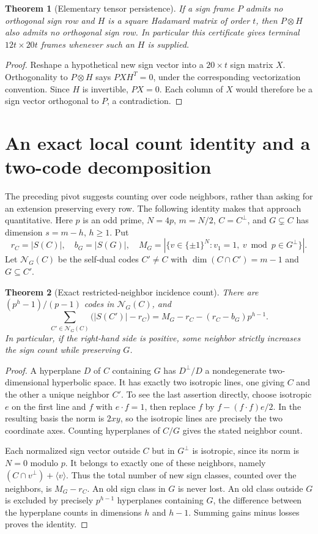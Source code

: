 \documentclass[11pt]{article}
\newtheorem{theorem}{Theorem}[section]
\begin{document}
\begin{theorem}[Elementary tensor persistence]
If a sign frame $P$ admits no orthogonal sign row and $H$ is a square
Hadamard matrix of order $t$, then $P\otimes H$ also admits no
orthogonal sign row. In particular this certificate gives terminal
$12t\times20t$ frames whenever such an $H$ is supplied.
\end{theorem}
\begin{proof}
Reshape a hypothetical new sign vector into a $20\times t$ sign
matrix $X$. Orthogonality to $P\otimes H$ says $PXH^T=0$, under
the corresponding vectorization convention. Since $H$ is invertible,
$PX=0$. Each column of $X$ would therefore be a sign vector
orthogonal to $P$, a contradiction.
\end{proof}
\section{An exact local count identity and a two-code decomposition}
\label{sec:neighbor-counts}

The preceding pivot suggests counting over code neighbors, rather
than asking for an extension preserving every row. The following
identity makes that approach quantitative. Here $p$ is an odd prime,
$N=4p$, $m=N/2$, $C=C^\perp$, and $G\subsetneq C$ has dimension
$s=m-h$, $h\ge1$. Put
\[
 r_C=|S(C)|,\quad b_G=|S(G)|,\quad
 M_G=|\{v\in\{\pm1\}^N:v_1=1,\ v\bmod p\in G^\perp\}|.
\]
Let $\mathcal N_G(C)$ be the self-dual codes $C'\ne C$ with
$\dim(C\cap C')=m-1$ and $G\subseteq C'$.

\begin{theorem}[Exact restricted-neighbor incidence count]
\label{code:neighbor-average}
There are $(p^h-1)/(p-1)$ codes in $\mathcal N_G(C)$, and
\[
 \boxed{\quad
 \sum_{C'\in\mathcal N_G(C)}\bigl(|S(C')|-r_C\bigr)
 =M_G-r_C-(r_C-b_G)p^{h-1}.\quad}
\]
In particular, if the right-hand side is positive, some neighbor
strictly increases the sign count while preserving $G$.
\end{theorem}
\begin{proof}
A hyperplane $D$ of $C$ containing $G$ has $D^\perp/D$ a nondegenerate
two-dimensional hyperbolic space. It has exactly two isotropic lines,
one giving $C$ and the other a unique neighbor $C'$.
To see the last assertion directly, choose isotropic $e$ on the first
line and $f$ with $e\cdot f=1$, then replace $f$ by
$f-(f\cdot f)e/2$. In the resulting basis the norm is $2xy$,
so the isotropic lines are precisely the two coordinate axes.
Counting hyperplanes of $C/G$ gives the stated neighbor count.

Each normalized sign vector outside $C$ but in $G^\perp$ is isotropic,
since its norm is $N=0$ modulo $p$. It belongs to exactly one of
these neighbors, namely
$(C\cap v^\perp)+\langle v\rangle$. Thus the total number of
new sign classes, counted over the neighbors, is $M_G-r_C$.
An old sign class in $G$ is never lost. An old class outside $G$
is excluded by precisely $p^{h-1}$ hyperplanes containing $G$,
the difference between the hyperplane counts in dimensions
$h$ and $h-1$. Summing gains minus losses proves the identity.
\end{proof}
\end{document}

